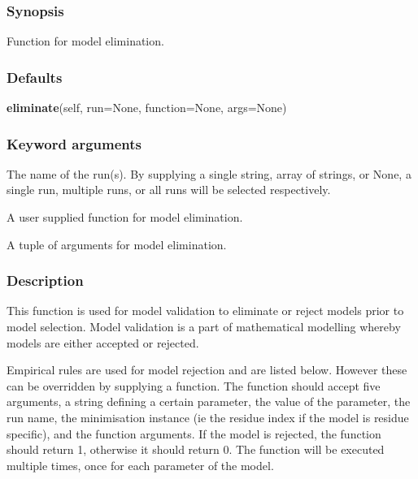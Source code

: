   
 \subsubsection{Synopsis} 

 Function for model elimination. 
  

  
 \subsubsection{Defaults} 

 \textsf{\textbf{eliminate}(self, run=None, function=None, args=None)} 

  
 \subsubsection{Keyword arguments} 

   The name of the run(s).  By supplying a single string, array of strings, or None, a single run, multiple runs, or all runs will be selected respectively.   

   A user supplied function for model elimination.   

   A tuple of arguments for model elimination.  

  

  
 \subsubsection{Description} 

 This function is used for model validation to eliminate or reject models prior to model selection.  Model validation is a part of mathematical modelling whereby models are either accepted or rejected. 
  

 Empirical rules are used for model rejection and are listed below.  However these can be overridden by supplying a function.  The function should accept five arguments, a string defining a certain parameter, the value of the parameter, the run name, the minimisation instance (ie the residue index if the model is residue specific), and the function arguments.  If the model is rejected, the function should return 1, otherwise it should return 0.  The function will be executed multiple times, once for each parameter of the model. 
  

